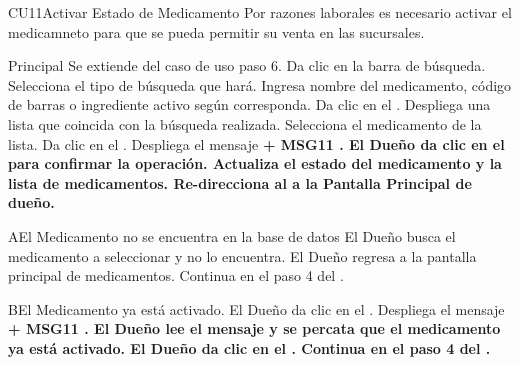 \begin{UseCase}{CU11}{Activar Estado de Medicamento}{
		Por razones laborales es necesario activar el medicamneto para que se pueda permitir su venta en las sucursales.
	}
	\end{UseCase}
	\begin{UCtrayectoria}{Principal}
		\UCpaso Se extiende del caso de uso  paso 6.
		\UCpaso[\UCactor] Da clic en la barra de búsqueda.
		\UCpaso[\UCactor] Selecciona el tipo de búsqueda que hará.
		\UCpaso [\UCactor] Ingresa nombre del medicamento, código de barras o ingrediente activo según corresponda. 
		\UCpaso[\UCactor] Da clic en el  .
		\UCpaso Despliega una lista que coincida con la búsqueda realizada. 
		\UCpaso[\UCactor] Selecciona el medicamento de la lista.
		\UCpaso[\UCactor] Da clic en el .
		\UCpaso Despliega el mensaje \bf {+ MSG11 }.
		\UCpaso[\UCactor] El Dueño da clic en el  para confirmar la operación. 
		\UCpaso Actualiza el estado del medicamento y la lista de medicamentos.
		\UCpaso Re-direcciona al \UCactor a la  {Pantalla Principal de dueño}.
	
	\end{UCtrayectoria}


		\begin{UCtrayectoriaA}{A}{El Medicamento no se encuentra en la base de datos}
			\UCpaso[\UCactor] El Dueño busca el medicamento a seleccionar y no lo encuentra.
			\UCpaso[\UCactor] El Dueño regresa a la pantalla principal de medicamentos.
			\UCpaso Continua en el paso 4 del .
		\end{UCtrayectoriaA}
		
		
		\begin{UCtrayectoriaA}{B}{El Medicamento ya está activado}.
			\UCpaso[\UCactor] El Dueño da clic en el .
			\UCpaso Despliega el mensaje \bf {+ MSG11 }.
			\UCpaso[\UCactor] El Dueño lee el mensaje y se percata que el medicamento ya está activado.
			\UCpaso[\UCactor] El Dueño da clic en el .
			\UCpaso Continua en el paso 4 del .
		\end{UCtrayectoriaA}

